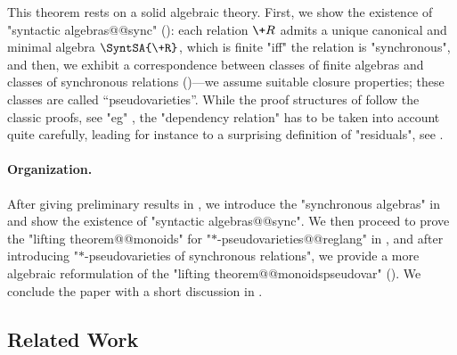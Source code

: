 This theorem rests on a solid algebraic theory. 
First, we show the existence of "syntactic algebras@@sync" (): 
each relation $\+R$ admits a unique canonical and minimal algebra $\SyntSA{\+R}$, which is finite 
"iff" the relation is "synchronous",
and then, we exhibit a correspondence between classes of finite algebras and classes of
synchronous relations ()---we assume suitable closure properties; these classes are called ``pseudovarieties''.
While the proof structures of  follow the classic proofs, see "eg" \cite{pin_mathematical_2022},
the "dependency relation" has to be taken into account quite carefully, leading for instance
to a surprising definition of "residuals", see .

\paragraph*{Organization.} After giving preliminary results in , we introduce
the "synchronous algebras" in  and show the existence of
"syntactic algebras@@sync". We then proceed to prove the "lifting theorem@@monoids" for 
"$*$-pseudovarieties@@reglang" in , and after introducing "$*$-pseudovarieties of synchronous relations", we provide a more algebraic reformulation of the "lifting 
theorem@@monoidspseudovar" ().
We conclude the paper with
a short discussion in .

\subsection{Related Work}


